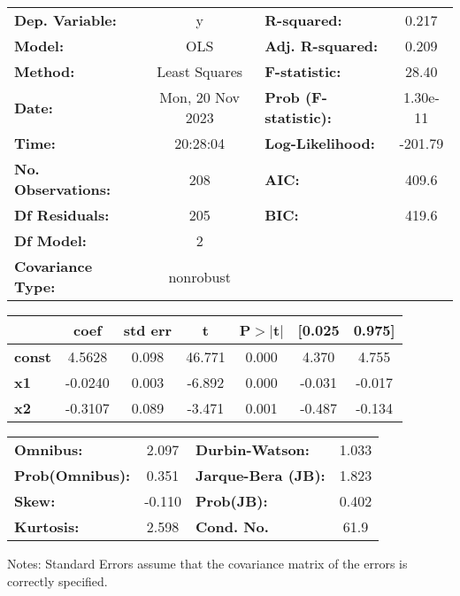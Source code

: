 \begin{center}
\begin{tabular}{lclc}
\toprule
\textbf{Dep. Variable:}    &        y         & \textbf{  R-squared:         } &     0.217   \\
\textbf{Model:}            &       OLS        & \textbf{  Adj. R-squared:    } &     0.209   \\
\textbf{Method:}           &  Least Squares   & \textbf{  F-statistic:       } &     28.40   \\
\textbf{Date:}             & Mon, 20 Nov 2023 & \textbf{  Prob (F-statistic):} &  1.30e-11   \\
\textbf{Time:}             &     20:28:04     & \textbf{  Log-Likelihood:    } &   -201.79   \\
\textbf{No. Observations:} &         208      & \textbf{  AIC:               } &     409.6   \\
\textbf{Df Residuals:}     &         205      & \textbf{  BIC:               } &     419.6   \\
\textbf{Df Model:}         &           2      & \textbf{                     } &             \\
\textbf{Covariance Type:}  &    nonrobust     & \textbf{                     } &             \\
\bottomrule
\end{tabular}
\begin{tabular}{lcccccc}
               & \textbf{coef} & \textbf{std err} & \textbf{t} & \textbf{P$> |$t$|$} & \textbf{[0.025} & \textbf{0.975]}  \\
\midrule
\textbf{const} &       4.5628  &        0.098     &    46.771  &         0.000        &        4.370    &        4.755     \\
\textbf{x1}    &      -0.0240  &        0.003     &    -6.892  &         0.000        &       -0.031    &       -0.017     \\
\textbf{x2}    &      -0.3107  &        0.089     &    -3.471  &         0.001        &       -0.487    &       -0.134     \\
\bottomrule
\end{tabular}
\begin{tabular}{lclc}
\textbf{Omnibus:}       &  2.097 & \textbf{  Durbin-Watson:     } &    1.033  \\
\textbf{Prob(Omnibus):} &  0.351 & \textbf{  Jarque-Bera (JB):  } &    1.823  \\
\textbf{Skew:}          & -0.110 & \textbf{  Prob(JB):          } &    0.402  \\
\textbf{Kurtosis:}      &  2.598 & \textbf{  Cond. No.          } &     61.9  \\
\bottomrule
\end{tabular}
\end{center}

Notes: \newline
 [1] Standard Errors assume that the covariance matrix of the errors is correctly specified.